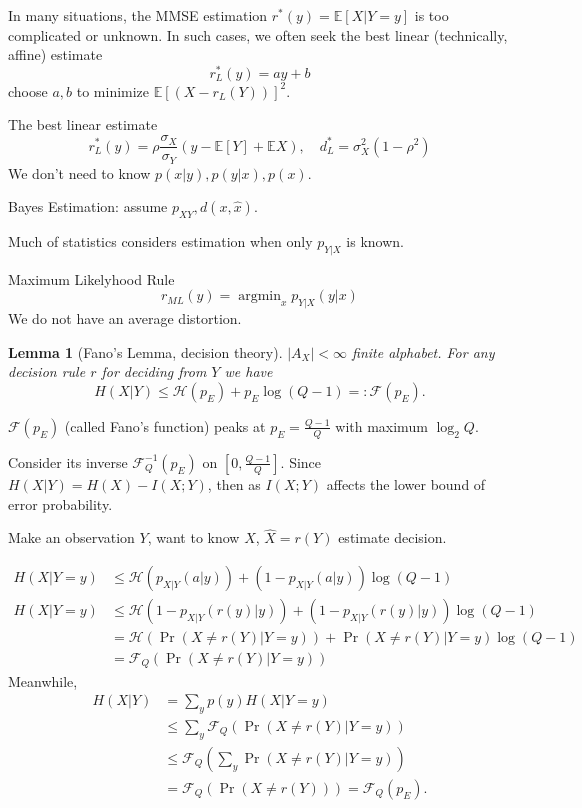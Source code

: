 \documentclass{report}
\newcommand{\matE}{\mathbb{E}}
\DeclareMathOperator*{\argmin}{\arg \min}
\newcommand{\eqdef}{=\mathrel{\mathop:}}
\newtheorem{lemma}{Lemma}[section]
\theoremstyle{definition}
\theoremstyle{remark}
\numberwithin{equation}{section}
\begin{document}
In many situations, the MMSE estimation $r^*(y) = \matE[X|Y=y]$ is too complicated or unknown.
In such cases, we often seek the best linear (technically, affine) estimate \[
  r^*_L(y) = ay + b  
\] choose $a, b$ to minimize $\matE[(X - r_L(Y))]^2$.

The best linear estimate \[r^*_L(y) = \rho\frac{\sigma_X}{\sigma_Y}(y - \matE[Y] + \matE{X}), \quad d^*_L = \sigma^2_X(1 - \rho^2)\] We don't need to know $p(x|y), p(y|x), p(x)$.

Bayes Estimation: assume $p_{XY}, d(x, \hat{x})$.

Much of statistics considers estimation when only $p_{Y|X}$ is known.

Maximum Likelyhood Rule \[r_{ML}(y) = \argmin_x p_{Y|X}(y|x)\] We do not have an average distortion.

\begin{lemma}[Fano's Lemma, decision theory]
  $|A_X| < \infty$ finite alphabet. For any decision rule $r$ for deciding from $Y$ we have \[H(X|Y) \leq \mathscr{H}(p_E) + p_E\log(Q - 1) \eqdef \mathscr{F}(p_E).\]
\end{lemma}
$\mathscr{F}(p_E)$ (called Fano's function) peaks at $p_E = \frac{Q-1}{Q}$ with maximum $\log_2Q$.

Consider its inverse $\mathscr{F}^{-1}_Q(p_E)$ on $\left[0, \frac{Q-1}{Q}\right]$. Since $H(X|Y) = H(X) - I(X; Y)$, then as $I(X; Y)$ affects the lower bound of error probability.

Make an observation $Y$, want to know $X$, $\hat{X} = r(Y)$ estimate decision.

\begin{align*}
  H(X|Y = y) & \leq \mathscr{H}(p_{X|Y}(a|y)) + (1 - p_{X|Y}(a|y))\log(Q - 1) \\
  H(X|Y = y) & \leq \mathscr{H}(1 - p_{X|Y}(r(y)|y)) + (1 - p_{X|Y}(r(y)|y))\log(Q - 1) \\
  & = \mathscr{H}(\Pr(X \neq r(Y)|Y = y)) + \Pr(X \neq r(Y)|Y = y)\log(Q - 1) \\
  & = \mathscr{F}_Q(\Pr(X \neq r(Y)|Y = y))
\end{align*}
Meanwhile, 
\begin{align*}
  H(X | Y) & = \sum_y p(y)H(X|Y = y) \\
  & \leq \sum_y \mathscr{F}_Q(\Pr(X \neq r(Y)|Y = y)) \\
  & \leq \mathscr{F}_Q\left(\sum_y \Pr(X \neq r(Y)|Y = y)\right) \\
  & = \mathscr{F}_Q(\Pr(X \neq r(Y))) = \mathscr{F}_Q(p_E).
\end{align*}
\end{document}
